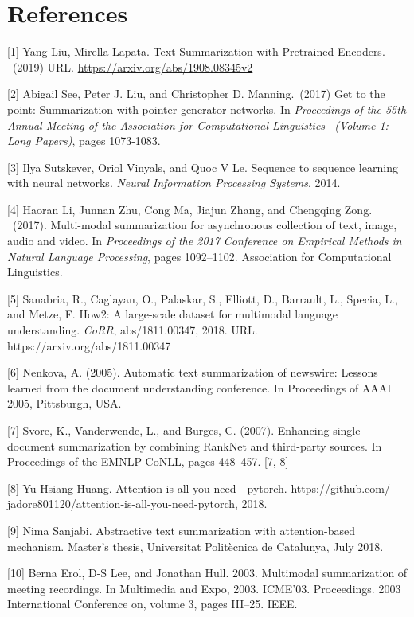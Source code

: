 \documentclass{article}
\begin{document}
\section*{References} 

[1] Yang Liu, Mirella Lapata. Text Summarization with Pretrained Encoders.  \ (2019) URL. \url{https://arxiv.org/abs/1908.08345v2}

[2] Abigail See, Peter J. Liu, and Christopher D. Manning.\ (2017) Get to the point: Summarization with pointer-generator networks. In {\it Proceedings of the 55th Annual Meeting of the Association for Computational Linguistics \ (Volume 1: Long Papers)}, pages 1073-1083.

[3] Ilya Sutskever, Oriol Vinyals, and Quoc V Le. Sequence to sequence learning with neural networks.
 {\it Neural Information Processing Systems}, 2014. 

[4] Haoran Li, Junnan Zhu, Cong Ma, Jiajun Zhang, and Chengqing Zong. \ (2017). Multi-modal summarization for
asynchronous collection of text, image, audio and video. In {\it Proceedings of the 2017 Conference on Empirical
Methods in Natural Language Processing}, pages 1092–1102. Association for Computational Linguistics.

[5] Sanabria, R., Caglayan, O., Palaskar, S., Elliott, D., Barrault, L., Specia, L., and Metze, F. How2: A large-scale dataset for multimodal language understanding. {\it CoRR}, abs/1811.00347, 2018. URL. https://arxiv.org/abs/1811.00347

[6] Nenkova, A. (2005). Automatic text summarization of newswire: Lessons learned from the document understanding conference. In Proceedings of AAAI 2005, Pittsburgh, USA.

[7] Svore, K., Vanderwende, L., and Burges, C. (2007). Enhancing single-document summarization by combining RankNet and third-party sources. In Proceedings of the EMNLP-CoNLL, pages 448–457. [7, 8] 

[8] Yu-Hsiang Huang. Attention is all you need - pytorch. https://github.com/ jadore801120/attention-is-all-you-need-pytorch, 2018.

[9] Nima Sanjabi. Abstractive text summarization with attention-based mechanism. Master’s thesis, Universitat Politècnica de Catalunya, July 2018.

[10] Berna Erol, D-S Lee, and Jonathan Hull. 2003. Multimodal summarization of meeting recordings. In Multimedia and Expo, 2003. ICME’03. Proceedings. 2003 International Conference on, volume 3, pages III–25. IEEE.
\end{document}
